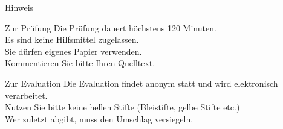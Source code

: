 \documentclass{hswbeamer}
\begin{document}
\begin{frame}[shrink]{Hinweis}
\begin{block}{Zur Prüfung}
    Die Prüfung dauert höchstens 120 Minuten.\\
    Es sind keine Hilfsmittel zugelassen.\\
    Sie dürfen eigenes Papier verwenden.\\
    Kommentieren Sie bitte Ihren Quelltext.
\end{block}
\begin{block}{Zur Evaluation}
    Die Evaluation findet anonym statt und wird elektronisch verarbeitet.\\
    Nutzen Sie bitte keine hellen Stifte (Bleistifte, gelbe Stifte etc.)\\
    Wer zuletzt abgibt, muss den Umschlag versiegeln.
\end{block}
\end{frame}

\begin{frame}{}
\end{frame}
\end{document}
